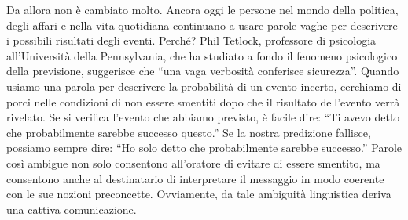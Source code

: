 Da allora non è cambiato molto. 
Ancora oggi le persone nel mondo della politica, degli affari e nella vita quotidiana continuano a usare parole vaghe per descrivere i possibili risultati degli eventi.
Perché? 
Phil Tetlock, professore di psicologia all'Università della Pennsylvania, che ha studiato a fondo il fenomeno psicologico della previsione, suggerisce che \enquote{una vaga verbosità conferisce sicurezza}.
Quando usiamo una parola per descrivere la probabilità di un evento incerto, cerchiamo di porci nelle condizioni di non essere smentiti dopo che il risultato dell'evento verrà rivelato. 
Se si verifica l'evento che abbiamo previsto, è facile dire: \enquote{Ti avevo detto che probabilmente sarebbe successo questo.} Se la nostra predizione fallisce, possiamo sempre dire: \enquote{Ho solo detto che probabilmente sarebbe successo.} 
Parole così ambigue non solo consentono all'oratore di evitare di essere smentito, ma consentono anche al destinatario di interpretare il messaggio in modo coerente con le sue nozioni preconcette. 
Ovviamente, da tale ambiguità linguistica deriva una cattiva comunicazione.
